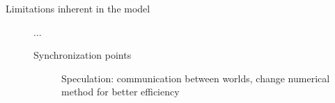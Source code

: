 \begin{description}
\item[Limitations inherent in the model] ...
\begin{description}
\item[Synchronization points] Speculation: communication between worlds, change numerical method for better efficiency

\end{description}

\end{description}


%
%
%
%




